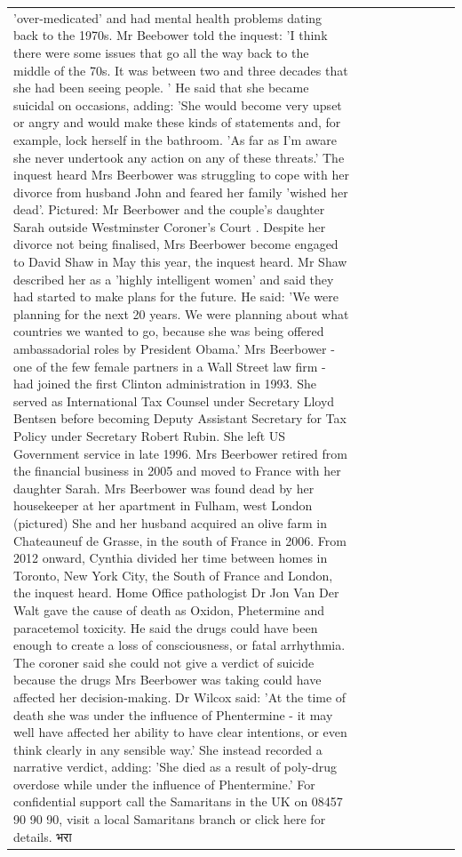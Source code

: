 \begin{table}[H]
\begin{tabular}{lllrlllll}
'over-medicated' and had mental health problems dating back to the 1970s. Mr Beebower told the inquest: 'I think there were some issues that go all the way back to the middle of the 70s. It was between two and three decades that she had been seeing people. ' He said that she became suicidal on occasions, adding: 'She would become very upset or angry and would make these kinds of statements and, for example, lock herself in the bathroom. 'As far as I'm aware she never undertook any action on any of these threats.' The inquest heard Mrs Beerbower was struggling to cope with her divorce from husband John and feared her family 'wished her dead'. Pictured: Mr Beerbower and the couple's daughter Sarah outside Westminster Coroner's Court . Despite her divorce not being finalised, Mrs Beerbower become engaged to David Shaw in May this year, the inquest heard. Mr Shaw described her as a 'highly intelligent women' and said they had started to make plans for the future. He said: 'We were planning for the next 20 years. We were planning about what countries we wanted to go, because she was being offered ambassadorial roles by President Obama.' Mrs Beerbower - one of the few female partners in a Wall Street law firm - had joined the first Clinton administration in 1993. She served as International Tax Counsel under Secretary Lloyd Bentsen before becoming Deputy Assistant Secretary for Tax Policy under Secretary Robert Rubin. She left US Government service in late 1996. Mrs Beerbower retired from the financial business in 2005 and moved to France with her daughter Sarah. Mrs Beerbower was found dead by her housekeeper at her apartment in Fulham, west London (pictured) She and her husband acquired an olive farm in Chateauneuf de Grasse, in the south of France in 2006. From 2012 onward, Cynthia divided her time between homes in Toronto, New York City, the South of France and London, the inquest heard. Home Office pathologist Dr Jon Van Der Walt gave the cause of death as Oxidon, Phetermine and paracetemol toxicity. He said the drugs could have been enough to create a loss of consciousness, or fatal arrhythmia. The coroner said she could not give a verdict of suicide because the drugs Mrs Beerbower was taking could have affected her decision-making. Dr Wilcox said: 'At the time of death she was under the influence of Phentermine - it may well have affected her ability to have clear intentions, or even think clearly in any sensible way.' She instead recorded a narrative verdict, adding: 'She died as a result of poly-drug overdose while under the influence of Phentermine.' For confidential support call the Samaritans in the UK on 08457 90 90 90, visit a local Samaritans branch or click here for details. भरा \\

\end{tabular}
\end{table}
